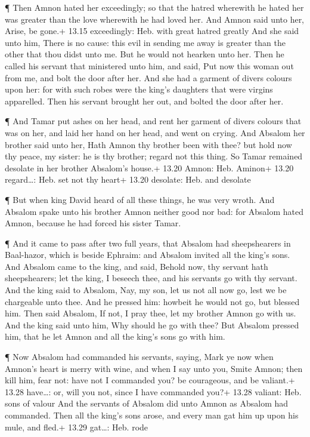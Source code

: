  ¶ Then Amnon hated her exceedingly; so that the hatred
wherewith he hated her was greater than the love wherewith he had loved
her. And Amnon said unto her, Arise, be gone.+ 13.15 exceedingly: Heb.
with great hatred greatly  And she said unto him, There is
no cause: this evil in sending me away is greater than the other that
thou didst unto me. But he would not hearken unto her. 
Then he called his servant that ministered unto him, and said, Put now
this woman out from me, and bolt the door after her.  And
she had a garment of divers colours upon her: for with such robes were
the king's daughters that were virgins apparelled. Then his servant
brought her out, and bolted the door after her.

 ¶ And Tamar put ashes on her head, and rent her garment of
divers colours that was on her, and laid her hand on her head, and went
on crying.  And Absalom her brother said unto her, Hath
Amnon thy brother been with thee? but hold now thy peace, my sister: he
is thy brother; regard not this thing. So Tamar remained desolate in her
brother Absalom's house.+ 13.20 Amnon: Heb. Aminon+ 13.20 regard\ldots:
Heb. set not thy heart+ 13.20 desolate: Heb. and desolate

 ¶ But when king David heard of all these things, he was
very wroth.  And Absalom spake unto his brother Amnon
neither good nor bad: for Absalom hated Amnon, because he had forced his
sister Tamar.

 ¶ And it came to pass after two full years, that Absalom
had sheepshearers in Baal-hazor, which is beside Ephraim: and Absalom
invited all the king's sons.  And Absalom came to the king,
and said, Behold now, thy servant hath sheepshearers; let the king, I
beseech thee, and his servants go with thy servant.  And
the king said to Absalom, Nay, my son, let us not all now go, lest we be
chargeable unto thee. And he pressed him: howbeit he would not go, but
blessed him.  Then said Absalom, If not, I pray thee, let
my brother Amnon go with us. And the king said unto him, Why should he
go with thee?  But Absalom pressed him, that he let Amnon
and all the king's sons go with him.

 ¶ Now Absalom had commanded his servants, saying, Mark ye
now when Amnon's heart is merry with wine, and when I say unto you,
Smite Amnon; then kill him, fear not: have not I commanded you? be
courageous, and be valiant.+ 13.28 have\ldots: or, will you not, since I
have commanded you?+ 13.28 valiant: Heb. sons of valour 
And the servants of Absalom did unto Amnon as Absalom had commanded.
Then all the king's sons arose, and every man gat him up upon his mule,
and fled.+ 13.29 gat\ldots: Heb. rode

